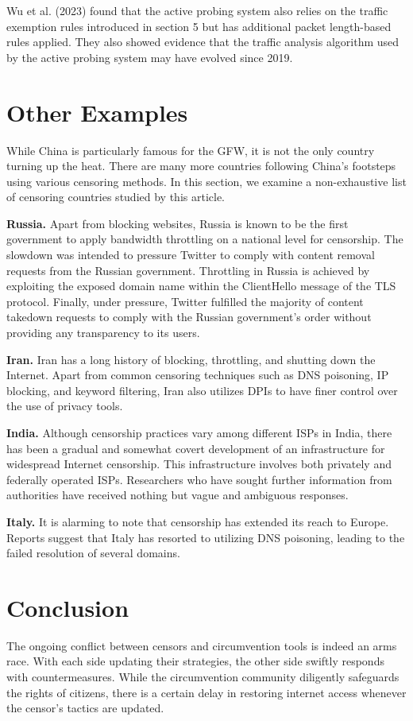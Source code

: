 Wu et al. (2023) found that the active probing system also relies on the traffic exemption rules introduced in section 5 but has additional packet length-based rules applied. They also showed evidence that the traffic analysis algorithm used by the active probing system may have evolved since 2019.\cite{wu2023great}
 
\section{Other Examples}
While China is particularly famous for the GFW, it is not the only country turning up the heat. There are many more countries following China's footsteps using various censoring methods. In this section, we examine a non-exhaustive list of censoring countries studied by this article.

\textbf{Russia.} Apart from blocking websites, Russia is known to be the first government to apply bandwidth throttling on a national level for censorship. The slowdown was intended to pressure Twitter to comply with content removal requests from the Russian government. Throttling in Russia is achieved by exploiting the exposed domain name within the ClientHello message of the TLS protocol. Finally, under pressure, Twitter fulfilled the majority of content takedown requests to comply with the Russian government’s order without providing any transparency to its users.\cite{xue2021throttling}\cite{chai2019importance}

\textbf{Iran.} Iran has a long history of blocking, throttling, and shutting down the Internet. Apart from common censoring techniques such as DNS poisoning, IP blocking, and keyword filtering, Iran also utilizes DPIs to have finer control over the use of privacy tools.\cite{aryan2013iran}

\textbf{India.} Although censorship practices vary among different ISPs in India, there has been a gradual and somewhat covert development of an infrastructure for widespread Internet censorship. This infrastructure involves both privately and federally operated ISPs. Researchers who have sought further information from authorities have received nothing but vague and ambiguous responses.\cite{yadav2018light}

\textbf{Italy.} It is alarming to note that censorship has extended its reach to Europe. Reports suggest that Italy has resorted to utilizing DNS poisoning, leading to the failed resolution of several domains.\cite{aceto2017italy}

\section{Conclusion}
The ongoing conflict between censors and circumvention tools is indeed an arms race. With each side updating their strategies, the other side swiftly responds with countermeasures. While the circumvention community diligently safeguards the rights of citizens, there is a certain delay in restoring internet access whenever the censor's tactics are updated.


